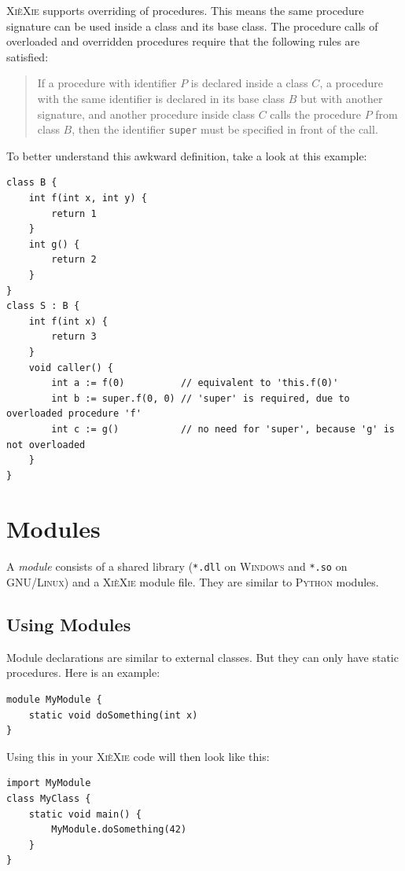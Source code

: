 \documentclass{report}
\def\xiexie{\textsc{Xi\`eXie}\xspace}
\def\python{\textsc{Python}\xspace}
\def\windows{\textsc{Windows}\xspace}
\def\linux{\textsc{GNU/Linux}\xspace}
\begin{document}
\xiexie supports overriding of procedures. This means the same procedure signature can be used inside a class and its
base class. The procedure calls of overloaded and overridden procedures require that the following rules are satisfied:
\begin{quote}
	If a procedure with identifier $P$ is declared inside a class $C$, a procedure with the same identifier is declared
	in its base class $B$ but with another signature, and another procedure inside class $C$ calls the procedure $P$
	from class $B$, then the identifier \texttt{super} must be specified in front of the call.
\end{quote}
To better understand this awkward definition, take a look at this example:
\begin{lstlisting}
class B {
    int f(int x, int y) {
        return 1
    }
    int g() {
        return 2
    }
}
class S : B {
    int f(int x) {
        return 3
    }
    void caller() {
        int a := f(0)          // equivalent to 'this.f(0)'
        int b := super.f(0, 0) // 'super' is required, due to overloaded procedure 'f'
        int c := g()           // no need for 'super', because 'g' is not overloaded
    }
}
\end{lstlisting}



\chapter{Modules}
\label{ch:modules}

A \textit{module} consists of a shared library (\texttt{*.dll} on \windows and \texttt{*.so} on \linux)
and a \xiexie module file. They are similar to \python modules.



\section{Using Modules}

Module declarations are similar to external classes. But they can only have static procedures. Here is an example:
\begin{lstlisting}
module MyModule {
    static void doSomething(int x)
}
\end{lstlisting}
Using this in your \xiexie code will then look like this:
\begin{lstlisting}
import MyModule
class MyClass {
    static void main() {
        MyModule.doSomething(42)
    }
}
\end{lstlisting}
\end{document}
